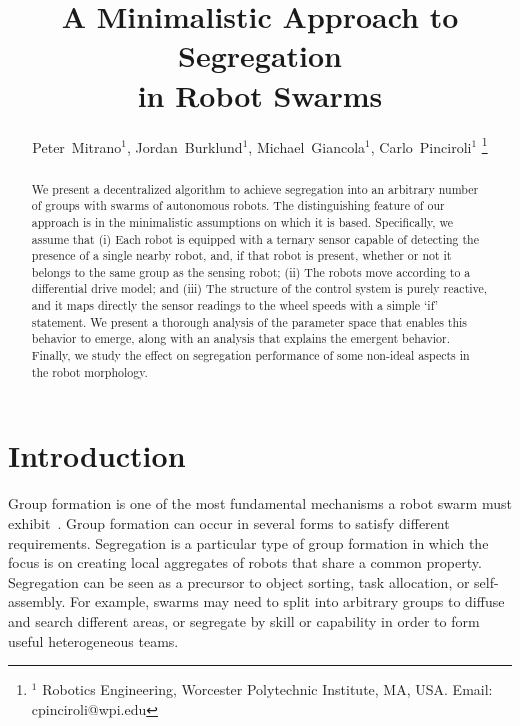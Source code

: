 \documentclass[letterpaper, 10 pt, conference]{ieeeconf}
\begin{document}
\title{\LARGE \bf
A Minimalistic Approach to Segregation\\
in Robot Swarms}

\author{
  Peter~Mitrano$^{1}$,
  Jordan~Burklund$^{1}$,
  Michael~Giancola$^{1}$,
  Carlo~Pinciroli$^{1}$%
  \thanks{$^{1}$ Robotics Engineering, Worcester Polytechnic Institute, MA, USA. Email: {\sf cpinciroli@wpi.edu}}%
}

\maketitle
\thispagestyle{empty}
\pagestyle{empty}

\begin{abstract}
  We present a decentralized algorithm to achieve segregation into an arbitrary number of groups with swarms of autonomous robots. The distinguishing feature of our approach is in the minimalistic assumptions on which it is based. Specifically, we assume that (i) Each robot is equipped with a ternary sensor capable of detecting the presence of a single nearby robot, and, if that robot is present, whether or not it belongs to the same group as the sensing robot; (ii) The robots move according to a differential drive model; and (iii) The structure of the control system is purely reactive, and it maps directly the sensor readings to the wheel speeds with a simple `if' statement. We present a thorough analysis of the parameter space that enables this behavior to emerge, along with an analysis that explains the emergent behavior. Finally, we study the effect on segregation performance of some non-ideal aspects in the robot morphology.
\end{abstract}

\section{Introduction}

Group formation is one of the most fundamental mechanisms a robot swarm must
exhibit~\cite{Brambilla2013}. Group formation can occur in several forms to
satisfy different requirements. Segregation is a particular type of group
formation in which the focus is on creating local aggregates of robots that
share a common property. Segregation can be seen as a precursor to object
sorting, task allocation, or self-assembly. For example, swarms may need to
split into arbitrary groups to diffuse and search different areas, or segregate
by skill or capability in order to form useful heterogeneous teams.
\end{document}
